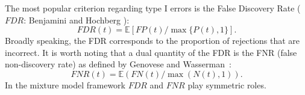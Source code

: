 \documentclass[10pt]{article}
\newcommand{\Esp}{{\mathbb E}}
\begin{document}

The most popular criterion regarding type I errors is
the False Discovery Rate ($FDR$: Benjamini and Hochberg  \cite{BeH95}):
$$
FDR(t) = \Esp\left[ FP(t) / \max\{P(t), 1\}\right].
$$
Broadly speaking, the FDR corresponds to the proportion of rejections
that are incorrect.{}
It is worth noting that a dual quantity of the FDR is the FNR (false
non-discovery rate) as defined by Genovese and Wasserman~\cite{GeW02}:
$$
FNR(t) = \Esp\left( FN(t) / \max(N(t), 1) \right).
$$
In the mixture model framework $FDR$ and $FNR$ play symmetric
roles.


\end{document}

